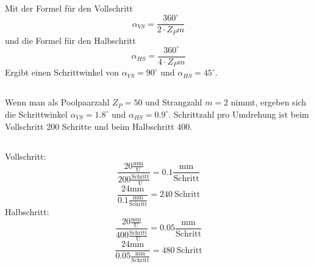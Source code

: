 \chapter{}\label{ex:aufg5}

\section{}\label{sec:aufg5a}
Mit der Formel für den Vollschritt
\begin{equation}
	\alpha_{VS} = \frac{360^\circ}{2\cdot Z_Pm}
\end{equation}
und die Formel für den Halbschritt
\begin{equation}
	\alpha_{HS} = \frac{360^\circ}{4\cdot Z_Pm}
\end{equation}
Ergibt einen Schrittwinkel von $\alpha_{VS} = 90^\circ$ und $\alpha_{HS} = 45^\circ$.
\section{}\label{sec:aufg5b}
Wenn man als Poolpaarzahl $Z_P = 50$ und Strangzahl $m = 2$ nimmt, ergeben sich die Schrittwinkel $\alpha_{VS} = 1.8^\circ$ und $\alpha_{HS} = 0.9^\circ$.
Schrittzahl pro Umdrehung ist beim Vollschritt 200 Schritte und beim Halbschritt 400.
\section{}\label{sec:aufg5c}
Vollschritt:
\begin{equation}
	\frac{20\frac{\mathrm{mm}}{\mathrm{U}}}{200\frac{\mathrm{Schritt}}{\mathrm{U}}} = 0.1 \frac{\mathrm{mm}}{\mathrm{Schritt}}
\end{equation}
\begin{equation}
	\frac{24 \mathrm{mm}}{0.1 \frac{\mathrm{mm}}{\mathrm{Schritt}}} = 240~\mathrm{Schritt}
\end{equation}
Halbschritt:
\begin{equation}
\frac{20\frac{\mathrm{mm}}{\mathrm{U}}}{400\frac{\mathrm{Schritt}}{\mathrm{U}}} = 0.05 \frac{\mathrm{mm}}{\mathrm{Schritt}}
\end{equation}
\begin{equation}
\frac{24 \mathrm{mm}}{0.05 \frac{\mathrm{mm}}{\mathrm{Schritt}}} = 480~\mathrm{Schritt}
\end{equation}
\clearpage
